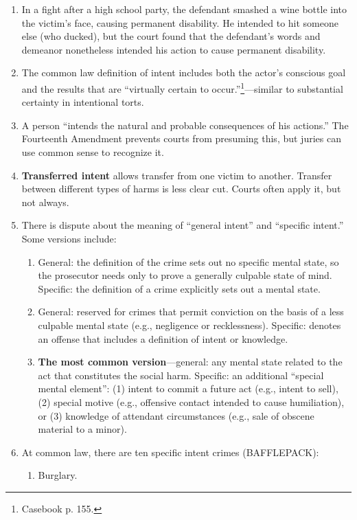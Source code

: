 \begin{enumerate}
    \item In a fight after a high school party, the defendant smashed a wine bottle into the victim's face, causing permanent disability. He intended to hit someone else (who ducked), but the court found that the defendant's words and demeanor nonetheless intended his action to cause permanent disability.
    \item The common law definition of intent includes both the actor's conscious goal and the results that are ``virtually certain to occur.''\footnote{Casebook p. 155.}---similar to substantial certainty in intentional torts.
    \item A person ``intends the natural and probable consequences of his actions.'' The Fourteenth Amendment prevents courts from presuming this, but juries can use common sense to recognize it.
    \item \textbf{Transferred intent}  allows transfer from one victim to another. Transfer between different types of harms is less clear cut. Courts often apply it, but not always.
    \item There is dispute about the meaning of ``general intent'' and ``specific intent.'' Some versions include:
    \begin{enumerate}
        \item General: the definition of the crime sets out no specific mental state, so the prosecutor needs only to prove a generally culpable state of mind. Specific: the definition of a crime explicitly sets out a mental state.
        \item General: reserved for crimes that permit conviction on the basis of a less culpable mental state (e.g., negligence or recklessness). Specific: denotes an offense that includes a definition of intent or knowledge.
        \item \textbf{The most common version}---general: any mental state related to the act that constitutes the social harm. Specific: an additional ``special mental element'': (1) intent to commit a future act (e.g., intent to sell), (2) special motive (e.g., offensive contact intended to cause humiliation), or (3) knowledge of attendant circumstances (e.g., sale of obscene material to a minor).
    \end{enumerate}
    \item At common law, there are ten specific intent crimes (BAFFLEPACK):
    \begin{enumerate}
        \item Burglary.

\end{enumerate}
\end{enumerate}
